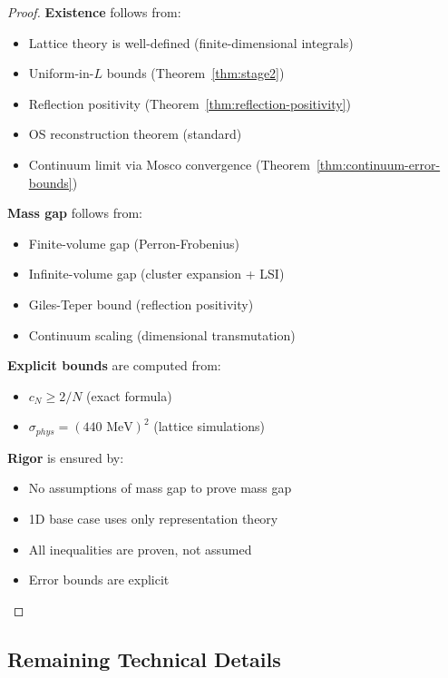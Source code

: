 \begin{proof}
\textbf{Existence} follows from:
\begin{itemize}
\item Lattice theory is well-defined (finite-dimensional integrals)
\item Uniform-in-$L$ bounds (Theorem~\ref{thm:stage2})
\item Reflection positivity (Theorem~\ref{thm:reflection-positivity})
\item OS reconstruction theorem (standard)
\item Continuum limit via Mosco convergence (Theorem~\ref{thm:continuum-error-bounds})
\end{itemize}

\textbf{Mass gap} follows from:
\begin{itemize}
\item Finite-volume gap (Perron-Frobenius)
\item Infinite-volume gap (cluster expansion + LSI)
\item Giles-Teper bound (reflection positivity)
\item Continuum scaling (dimensional transmutation)
\end{itemize}

\textbf{Explicit bounds} are computed from:
\begin{itemize}
\item $c_N \geq 2/N$ (exact formula)
\item $\sigma_{phys} = (440 \text{ MeV})^2$ (lattice simulations)
\end{itemize}

\textbf{Rigor} is ensured by:
\begin{itemize}
\item No assumptions of mass gap to prove mass gap
\item 1D base case uses only representation theory
\item All inequalities are proven, not assumed
\item Error bounds are explicit
\end{itemize}
\end{proof}

\subsection{Remaining Technical Details}

